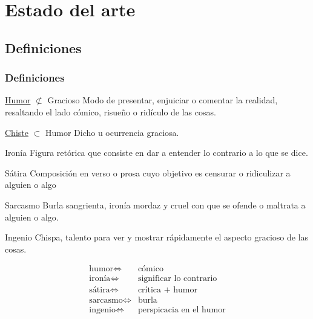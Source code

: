 \section{Estado del arte}

\subsection{Definiciones}
\begin{frame}[allowframebreaks]
    \frametitle{Definiciones}

    \begin{block}{\underline{Humor} $\not\subset$ Gracioso}
        Modo de presentar, enjuiciar o comentar la realidad, resaltando el lado cómico, risueño o ridículo de las cosas.  
    \end{block}
    \begin{block}{\underline{Chiste} $\subset$ Humor}
        Dicho u ocurrencia graciosa.
    \end{block}

    \framebreak

    \begin{block}{Ironía}
        Figura retórica que consiste en dar a entender lo contrario a lo que se dice.
    \end{block}
    \begin{block}{Sátira}
        Composición en verso o prosa cuyo objetivo es censurar o ridiculizar a alguien o algo
    \end{block}
    \begin{block}{Sarcasmo}
        Burla sangrienta, ironía mordaz y cruel con que se ofende o maltrata a alguien o algo.
    \end{block}
    \begin{block}{Ingenio}
        Chispa, talento para ver y mostrar rápidamente el aspecto gracioso de las cosas.
    \end{block}

    \framebreak
        
    \begin{align*}
        \text{humor} \iff&  \text{cómico} \\
        \text{ironía} \iff& \text{significar lo contrario} \\
        \text{sátira} \iff& \text{crítica + humor} \\
        \text{sarcasmo} \iff& \text{burla} \\
        \text{ingenio}  \iff& \text{perspicacia en el humor}
    \end{align*}
\end{frame}

